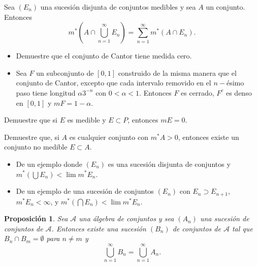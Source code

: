 \documentclass[12pt]{article}
\newenvironment{problem}[2][Problema]{\begin{trivlist}
\item[\hskip \labelsep {\bfseries #1}\hskip \labelsep {\bfseries #2.}]}{\end{trivlist}}
\newtheorem{prop}{Proposición}
\begin{document}
\begin{problem}{12}
Sea $(E_n)$ una sucesión disjunta de conjuntos medibles y sea $A$ un conjunto. Entonces $$ m^* \left(A \cap \bigcup_{n=1}^{\infty} E_n \right) = \sum_{n=1}^{\infty} m^*(A \cap E_n).$$
\end{problem}



\begin{problem}{13}

\end{problem}



\begin{problem}{14}
\text{ }
\begin{itemize}
    \item[a. ] Demuestre que el conjunto de Cantor tiene medida cero.
    \item[b. ] Sea $F$ un subconjunto de $[0, 1]$ construido de la misma manera que el conjunto de Cantor, excepto que cada intervalo removido en el $n-$ésimo paso tiene longitud  $\alpha 3^{-n}$ con $0 < \alpha < 1$. Entonces $F$ es cerrado, $F^c$ es denso en $[0, 1]$ y $m F = 1 - \alpha$.
\end{itemize}
\end{problem}



\begin{problem}{15}
Demuestre que si $E$ es medible y $E \subset P$, entonces $m E = 0.$
\end{problem}



\begin{problem}{16}
Demuestre que, si $A$ es cualquier conjunto con $m^* A > 0$, entonces existe un conjunto no medible $E \subset A.$
\end{problem}



\begin{problem}{17}
\text{ }
\begin{itemize}
    \item[a. ] De un ejemplo donde $(E_n)$ es una sucesión disjunta de conjuntos y $m^*(\bigcup E_n) < \lim m^* E_n$.
    \item[b. ] De un ejemplo de una sucesión de conjuntos $(E_n)$ con $E_n \supset E_{n+1}$, $m^* E_n < \infty $, y $m^*(\bigcap E_n) < \lim m^* E_n.$
\end{itemize}


\end{problem}

\newpage
\appendix

\begin{prop} \label{p1}
Sea $\mathcal{A}$ una álgebra de conjuntos y sea $(A_n)$ una sucesión de conjuntos de $\mathcal{A}$. Entonces existe una sucesión $(B_n)$ de conjuntos de $\mathcal{A}$ tal que $B_n \cap B_m = \emptyset$ para $n \neq m$ y 
$$\bigcup_{n=1}^{\infty}B_n = \bigcup_{n=1}^{\infty}A_n .$$
\end{prop}
\end{document}
